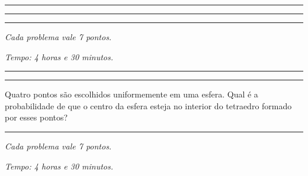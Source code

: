 \documentclass[10pt, a4paper]{article}
\newcommand{\rulesep}{
	\vspace{4mm}

	\hrule

	\vspace{3.5mm}
}
\begin{document}
	\pagestyle{empty}
	
	\contesttitle
	
	\vspace{4mm}

	
	\rulesep

	
	\rulesep
	

	\rulesep

	{\hfill \slshape Cada problema vale 7 pontos.}

	{\hfill \slshape Tempo: 4 horas e 30 minutos.}

	\newpage
	
	\contesttitle

	\vspace{4mm}
	
	\rulesep
	\rulesep
	\begin{prob} %
		Quatro pontos são escolhidos uniformemente em uma esfera. Qual é a probabilidade de que o centro da esfera esteja no interior do tetraedro formado por esses pontos?
	\end{prob}
	\rulesep

	{\hfill \slshape Cada problema vale 7 pontos.}
	
	{\hfill \slshape Tempo: 4 horas e 30 minutos.}
\end{document}
